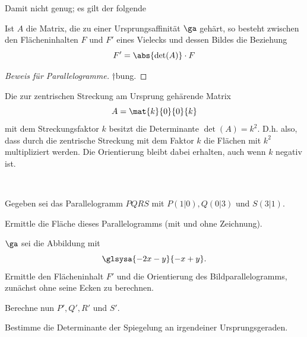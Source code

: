 \documentclass[%
11pt,%
twoside,%
titlepage,%
german,%
headsepline%
]{scrartcl}
\begin{document}
Damit nicht genug; es gilt der folgende

\begin{satz}
Ist $A$ die Matrix, die zu einer Ursprungsaffinität $\ga$ gehärt, so besteht zwischen den
Flächeninhalten $F$ und $F'$ eines Vielecks und dessen Bildes die Beziehung
$$F'=\abs{\det(A)}\cdot F$$
\end{satz}

\begin{proof}[Beweis für Parallelogramme]
†bung.
\end{proof}

\begin{bsp}
Die zur zentrischen Streckung am Ursprung gehärende Matrix
$$A=\mat{k}{0}{0}{k}$$
mit dem Streckungsfaktor $k$ besitzt die Determinante $\det(A) = k^2$. D.h. also, dass durch die zentrische Streckung mit dem Faktor $k$ die Flächen mit $k^2$ multipliziert werden. Die Orientierung bleibt dabei erhalten, auch wenn $k$ negativ ist.
\end{bsp}

\begin{ueb}
\ \\[-4ex]
\begin{enumeratea}
\item Gegeben sei das Parallelogramm $PQRS$ mit $P(1|0), Q(0|3)$ und $S(3|1)$.
\begin{enumeratei}
\item Ermittle die Fläche dieses Parallelogramms (mit und ohne Zeichnung).
\item $\ga$ sei die Abbildung mit
$$\glsysa{-2x-y}{-x+y}.$$
Ermittle den Flächeninhalt $F'$ und die Orientierung des Bildparallelogramms, zunächst ohne seine Ecken zu berechnen.
\item Berechne nun $P', Q', R'$ und $S'$.
\end{enumeratei}
\begin{center}
\end{center}
\item Bestimme die Determinante der Spiegelung an irgendeiner Ursprungsgeraden.
\end{enumeratea}
\end{ueb}
\end{document}
